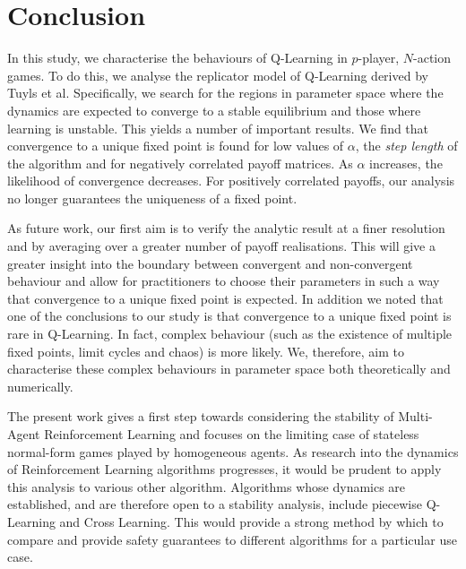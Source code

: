 \documentclass[sigconf,anonymous]{aamas}
\begin{document}

\section{Conclusion}

In this study, we characterise the behaviours of Q-Learning in $p$-player, $N$-action games. To do this, we analyse the replicator model of Q-Learning derived by Tuyls et al. Specifically, we search for the regions in parameter space where the dynamics are expected to converge to a stable equilibrium and those where learning is unstable. This yields a number of important results. We find that convergence to a unique fixed point is found for low values of $\alpha$, the \textit{step length} of the algorithm and for negatively correlated payoff matrices. As $\alpha$ increases, the likelihood of convergence decreases. For positively correlated payoffs, our analysis no longer guarantees the uniqueness of a fixed point. 


As future work, our first aim is to verify the analytic result at a finer resolution and by averaging over a greater number of payoff realisations. This will give a greater insight into the boundary between convergent and non-convergent behaviour and allow for practitioners to choose their parameters in such a way that convergence to a unique fixed point is expected. In addition we noted that one of the conclusions to our study is that convergence to a unique fixed point is rare in Q-Learning. In fact, complex behaviour (such as the existence of multiple fixed points, limit cycles and chaos) is more likely. We, therefore, aim to characterise these complex behaviours in parameter space both theoretically and numerically.

The present work gives a first step towards considering the stability of Multi-Agent Reinforcement Learning and focuses on the limiting case of stateless normal-form games played by homogeneous agents. As research into the dynamics of Reinforcement Learning algorithms progresses, it would be prudent to apply this analysis to various other algorithm. Algorithms whose dynamics are established, and are therefore open to a stability analysis, include piecewise Q-Learning and Cross Learning. This would provide a strong method by which to compare and provide safety guarantees to different algorithms for a particular use case. 

\end{document}
